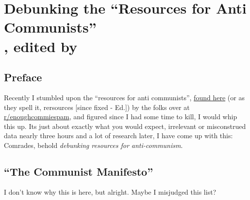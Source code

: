 \section[Debunking the ``Resources for Anti Communists'']{Debunking the ``Resources for Anti Communists''\\\small{, edited by }}
\subsection*{Preface}
Recently I stumbled upon the ``resources for anti communists'', \href{https://www.reddit.com/r/EnoughCommieSpam/wiki/anti_commie_resources}{found here} (or as they spell it, rersources [since fixed - Ed.]) by the folks over at \href{https://np.reddit.com/r/enoughcommiespam}{r/enoughcommiespam}, and figured since I had some time to kill, I would whip this up.
Its just about exactly what you would expect, irrelevant or misconstrued data nearly three hours and a lot of research later, I have come up with this: Comrades, behold \emph{debunking resources for anti-communism}.

\subsection{``The Communist Manifesto''}
I don't know why this is here, but alright. Maybe I misjudged this list?

